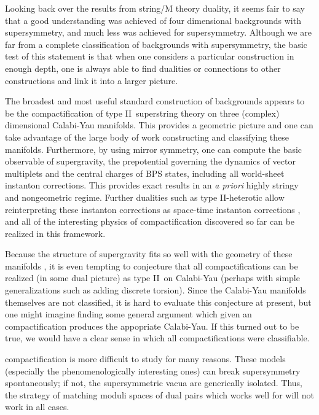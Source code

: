 \documentclass[a4paper,12pt]{amsart}
\numberwithin{equation}{section}
\theoremstyle{plain}
\theoremstyle{definition}
\def\cal{\mathcal}
\def \II {II}
\def\CN{{\cal N}}
\begin{document}
Looking back over the results from string/M theory duality, it seems
fair to say that a good understanding was achieved of four
dimensional backgrounds with \myHighlight{$\CN=2$}\coordHE{} supersymmetry, and much less
was achieved for \myHighlight{$\CN=1$}\coordHE{} supersymmetry.  Although we are far from a
complete classification of backgrounds with \myHighlight{$\CN=2$}\coordHE{} supersymmetry,
the basic test of this statement is that when one considers
a particular \myHighlight{$\CN=2$}\coordHE{} construction in enough depth, one is always able
to find dualities or connections to other constructions and
link it into a larger picture.

The broadest and most useful standard construction of \myHighlight{$\CN=2$}\coordHE{}
backgrounds appears to be the compactification of type \II\
superstring theory on three (complex) dimensional Calabi-Yau
manifolds.  This provides a geometric picture and one can take
advantage of the large body of work constructing and classifying these
manifolds.  Furthermore, by using mirror symmetry, one can compute the
basic observable of \myHighlight{$\CN=2$}\coordHE{} supergravity, the prepotential governing
the dynamics of vector multiplets and the central charges of BPS
states, including all world-sheet instanton corrections.  This
provides exact results in an {\it a priori} highly stringy and
nongeometric regime.  Further dualities such as type \II-heterotic
allow reinterpreting these instanton corrections as space-time
instanton corrections \cite{KachruVafa}, and all of the interesting
physics of \myHighlight{$\CN=2$}\coordHE{} compactification discovered so far can be realized
in this framework.

Because the structure of \myHighlight{$\CN=2$}\coordHE{} supergravity fits so well with the
geometry of these manifolds \cite{Strominger}, it is even tempting
to conjecture that all \myHighlight{$\CN=2$}\coordHE{} compactifications can be realized (in
some dual picture) as type \II\ on Calabi-Yau (perhaps with simple
generalizations such as adding discrete torsion).  Since the
Calabi-Yau manifolds themselves are not classified, it is hard to
evaluate this conjecture at present, but one might imagine finding some
general argument which given an \myHighlight{$\CN=2$}\coordHE{} compactification produces the
appopriate Calabi-Yau.  If this turned out to be true, we would have
a clear sense in which all \myHighlight{$\CN=2$}\coordHE{} compactifications were classifiable.

\myHighlight{$\CN=1$}\coordHE{} compactification is more difficult to study for many reasons.
These models (especially the phenomenologically interesting ones) can
break supersymmetry spontaneously; if not, the supersymmetric vacua
are generically isolated.  Thus, the strategy of matching moduli
spaces of dual pairs which works well for \myHighlight{$\CN=2$}\coordHE{} will not work
in all cases.
\end{document}
